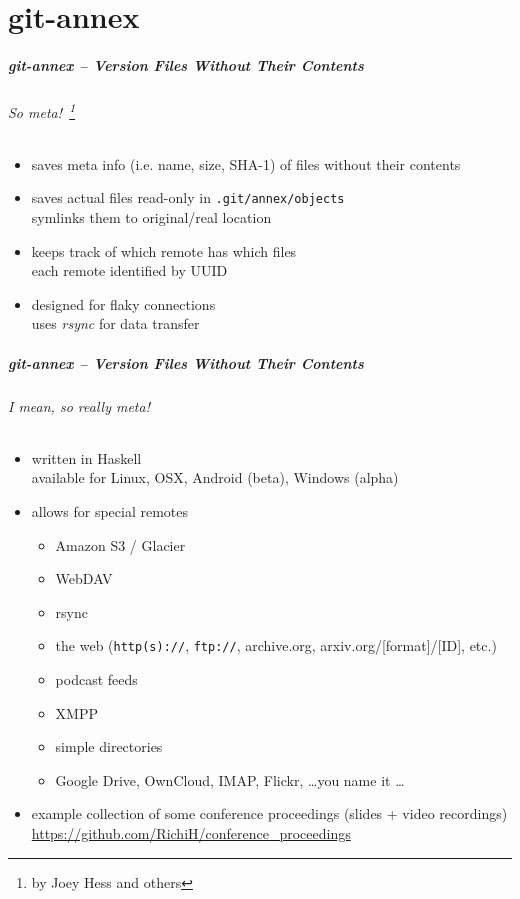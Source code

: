 \documentclass[english,hyperref={pdfpagelabels=false},aspectratio=1610]{beamer}
\begin{document}
\part{git-annex}
\makepart

\begin{frame}[label=gitannex]
  \frametitle{git-annex -- Version Files Without Their Contents}
  \framesubtitle{So meta!~\footnote{\tiny by Joey Hess and others}}
  \begin{itemize}
    \item saves meta info {\scriptsize\color{fzjgray50}(i.e. name, size, SHA-1)} of files without their contents
    \item saves actual files read-only in \texttt{.git/annex/objects}\\
      {\scriptsize symlinks them to original/real location}
    \item keeps track of which remote has which files\\
      {\scriptsize each remote identified by UUID}
    \item designed for flaky connections\\
      {\scriptsize uses \emph{rsync} for data transfer}
  \end{itemize}
\end{frame}

\begin{frame}
  \frametitle{git-annex -- Version Files Without Their Contents}
  \framesubtitle{I mean, so really meta!}
  \begin{itemize}
    \item written in Haskell\\
      {\scriptsize available for Linux, OSX, Android (beta), Windows (alpha)}
    \item allows for special remotes
      \begin{itemize}
        \item Amazon S3 / Glacier
        \item WebDAV
        \item rsync
        \item the web {\scriptsize\color{fzjgray50}(\texttt{http(s)://}, \texttt{ftp://}, archive.org, arxiv.org/[format]/[ID], etc.)}
        \item podcast feeds
        \item XMPP
        \item simple directories
        \item Google Drive, OwnCloud, IMAP, Flickr, \dots you name it \dots
      \end{itemize}
    \item example collection of some conference proceedings {\scriptsize\color{fzjgray50}(slides + video recordings)}\\
      {\scriptsize \url{https://github.com/RichiH/conference_proceedings}}
  \end{itemize}
\end{frame}
\end{document}
